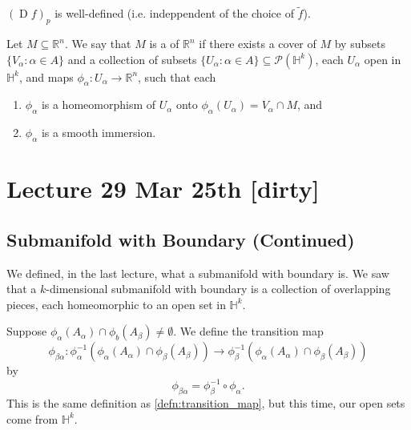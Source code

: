 \documentclass[notoc,notitlepage]{tufte-book}
\DeclareMathOperator{\D}{D}
\begin{document}
 $(\D f)_p$ is well-defined (i.e. indeppendent of the choice of
$\tilde{f}$).

\begin{defn}\label{defn:submanifold_with_boundary}
  Let $M \subseteq \mathbb{R}^n$. We say that $M$ is a  of $\mathbb{R}^n$ if there exists a cover of $M$ by
  subsets $\{ V_\alpha : \alpha \in A \}$ and a collection of subsets $\{
  U_\alpha : \alpha \in A \} \subseteq \mathcal{P}(\mathbb{H}^k)$, each
  $U_\alpha$ open in $\mathbb{H}^k$, and maps $\phi_\alpha : U_\alpha \to
  \mathbb{R}^n$, such that each
  \begin{enumerate}
    \item $\phi_\alpha$ is a homeomorphism of $U_\alpha$ onto
      $\phi_\alpha(U_\alpha) = V_\alpha \cap M$, and
    \item $\phi_\alpha$ is a smooth immersion.
  \end{enumerate}
\end{defn}



\chapter{Lecture 29 Mar 25th [dirty]}%
\label{chp:lecture_29_mar_25th}

\section{Submanifold with Boundary (Continued)}%
\label{sec:submanifold_with_boundary_continued}

We defined, in the last lecture, what a submanifold with boundary is. We saw
that a $k$-dimensional submanifold with boundary is a collection of overlapping
pieces, each homeomorphic to an open set in $\mathbb{H}^k$.

Suppose $\phi_\alpha(A_\alpha) \cap \phi_b(A_\beta) \neq \emptyset$. We define
the transition map
\begin{equation*}
  \phi_{\beta\alpha} : \phi_\alpha^{-1}(\phi_\alpha(A_\alpha) \cap
  \phi_\beta(A_\beta)) \to \phi_\beta^{-1}(\phi_\alpha(A_\alpha) \cap
  \phi_\beta(A_\beta))
\end{equation*}
by
\begin{equation*}
  \phi_{\beta\alpha} = \phi_\beta^{-1} \circ \phi_\alpha.
\end{equation*}
This is the same definition as \cref{defn:transition_map}, but this time, our
open sets come from $\mathbb{H}^k$.
\end{document}
